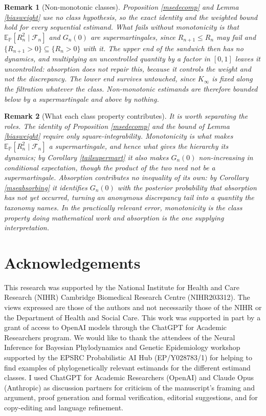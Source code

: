 \documentclass{article}
\newcommand{\E}{\mathbb{E}_{\mathbb{P}}}
\newcommand{\F}{\mathcal{F}}
\newcommand{\1}{\mathbbm{1}}
\newtheorem{remark}{Remark}
\begin{document}
\begin{remark}[Non-monotonic classes]
\label{msenonmono}
Proposition \ref{msedecomp} and Lemma \ref{biasweight} use no class hypothesis, so the exact
identity and the weighted bound hold for every sequential estimand. What fails without monotonicity
is that $\E[R_n^2\mid\F_n]$ and $G_n(0)$ are supermartingales, since $R_{n+1}\le R_n$ may fail and
$\{R_{n+1}>0\}\subseteq\{R_n>0\}$ with it. The upper end of the sandwich then has no dynamics, and
multiplying an uncontrolled quantity by a factor in $[0,1]$ leaves it uncontrolled: absorption does
not repair this, because it controls the weight and not the discrepancy. The lower end survives
untouched, since $K_\infty$ is fixed along the filtration whatever the class. Non-monotonic
estimands are therefore bounded below by a supermartingale and above by nothing.
\end{remark}

\begin{remark}[What each class property contributes]
\label{mseattribution}
It is worth separating the roles. The identity of Proposition \ref{msedecomp} and the bound of
Lemma \ref{biasweight} require only square-integrability. Monotonicity is what makes
$\E[R_n^2\mid\F_n]$ a supermartingale, and hence what gives the hierarchy its dynamics; by
Corollary \ref{tailsupermart} it also makes $G_n(0)$ non-increasing in conditional expectation,
though the product of the two need not be a supermartingale. Absorption contributes no inequality
of its own: by Corollary \ref{mseabsorbing} it identifies $G_n(0)$ with the posterior probability
that absorption has not yet occurred, turning an anonymous discrepancy tail into a quantity the
taxonomy names. In the practically relevant error, monotonicity is the class property doing
mathematical work and absorption is the one supplying interpretation.
\end{remark}

\section{Acknowledgements}
This research was supported by the National Institute for Health and Care Research (NIHR) Cambridge Biomedical Research Centre (NIHR203312). The views expressed are those of the authors and not necessarily those of the NIHR or the Department of Health and Social Care. This work was supported in part by a grant of access to OpenAI models through the ChatGPT for Academic Researchers program. We would like to thank the attendees of the Neural Inference for Bayesian Phylodynamics and Genetic Epidemiology workshop supported by the EPSRC Probabilistic AI Hub (EP/Y028783/1) for helping to find examples of phylogenetically relevant estimands for the different estimand classes. I used ChatGPT for Academic Researchers (OpenAI) and Claude Opus (Anthropic) as discussion partners for criticism of the manuscript's framing and argument, proof generation and formal verification, editorial suggestions, and for copy-editing and language refinement. 
\end{document}
